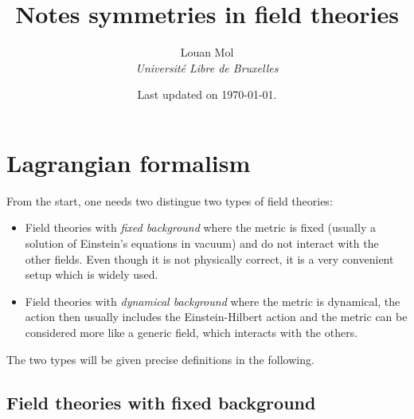 \documentclass[a4paper,10pt]{article}
\title{\vspace{-2cm}\textbf{Notes symmetries in field theories}}
\author{Louan Mol\\ \textit{Université Libre de Bruxelles}}
\date{Last updated on \today.}
\begin{document}
\maketitle

\tableofcontents

\section{Lagrangian formalism}

    From the start, one needs two distingue two types of field theories:
    \begin{itemize}
        \item Field theories with \emph{fixed background} where the metric is fixed (usually a solution of Einstein's equations in vacuum) and do not interact with the other fields. Even though it is not physically correct, it is a very convenient setup which is widely used.
        \item Field theories with \emph{dynamical background} where the metric is dynamical, the action then usually includes the Einstein-Hilbert action and the metric can be considered more like a generic field, which interacts with the others.
    \end{itemize}
    The two types will be given precise definitions in the following.

    \subsection{Field theories with fixed background}
\end{document}

